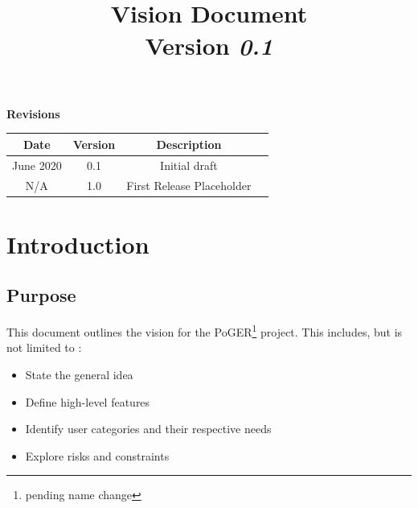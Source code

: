 \documentclass[11pt]{article}
\title{\vspace{15mm}{\HUGE PoGER\footnote{pending name change}}\\
	Vision Document\\
	Version \textit{0.1}}
\author{}
\date{}
\begin{document}
	

\maketitle


\vspace{30mm}
\begin{center}
	{\Large \textbf{Revisions}}
	\vspace{5mm}
	
	\begin{tabular}{|c|c|c|c|}
		\hline
		\rowcolor{mylightgray}
		\hspace{4mm}\textbf{Date}\hspace{4mm} & \hspace{4mm}\textbf{Version}\hspace{4mm} & \hspace{4mm}\textbf{Description}\hspace{4mm} \\
		\hline
		June \nth{28} 2020 & 0.1 & Initial draft \\
		\hline
		N/A & 1.0 & First Release Placeholder \\
		\hline
	\end{tabular}
\end{center}






\newpage

\begingroup
\hypersetup{linkcolor=black}
\tableofcontents
\endgroup




\newpage

\section{Introduction}

\subsection{Purpose}

This document outlines the vision for the PoGER\footnote{pending name change} project. This includes, but is not limited to :

\begin{itemize}
	\item State the general idea
	
	\item Define high-level features
	
	\item Identify user categories and their respective needs
	
	\item Explore risks and constraints
\end{itemize}
\end{document}
